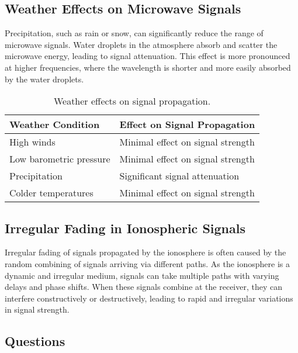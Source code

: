 \subsection*{Weather Effects on Microwave Signals}
Precipitation, such as rain or snow, can significantly reduce the range of microwave signals. Water droplets in the atmosphere absorb and scatter the microwave energy, leading to signal attenuation. This effect is more pronounced at higher frequencies, where the wavelength is shorter and more easily absorbed by the water droplets.

\begin{table}[h!]
    \centering
    \begin{tabular}{|l|l|}
        \hline
        \textbf{Weather Condition} & \textbf{Effect on Signal Propagation} \\
        \hline
        High winds & Minimal effect on signal strength \\
        Low barometric pressure & Minimal effect on signal strength \\
        Precipitation & Significant signal attenuation \\
        Colder temperatures & Minimal effect on signal strength \\
        \hline
    \end{tabular}
    \caption{Weather effects on signal propagation.}
    \label{tab:weather_effects}
\end{table}

\subsection*{Irregular Fading in Ionospheric Signals}
Irregular fading of signals propagated by the ionosphere is often caused by the random combining of signals arriving via different paths. As the ionosphere is a dynamic and irregular medium, signals can take multiple paths with varying delays and phase shifts. When these signals combine at the receiver, they can interfere constructively or destructively, leading to rapid and irregular variations in signal strength.

\subsection*{Questions}

